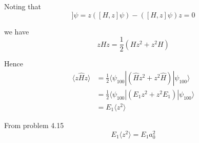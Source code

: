 


Noting that
\begin{equation*}
[z,[H,z]]\psi=z([H,z]\psi)-([H,z]\psi)z=0
\end{equation*}

we have
\begin{equation*}
zHz=\frac{1}{2}(Hz^2+z^2H)
\end{equation*}

Hence
\begin{align*}
\langle z\hat Hz\rangle&=\frac{1}{2}\langle\psi_{100}|(\hat Hz^2+z^2\hat H)|\psi_{100}\rangle
\\
&=\frac{1}{2}\langle\psi_{100}|(E_1z^2+z^2E_1)|\psi_{100}\rangle
\\
&=E_1\langle z^2\rangle
\end{align*}

From problem 4.15
\begin{equation*}
E_1\langle z^2\rangle=E_1a_0^2\tag{1}
\end{equation*}



